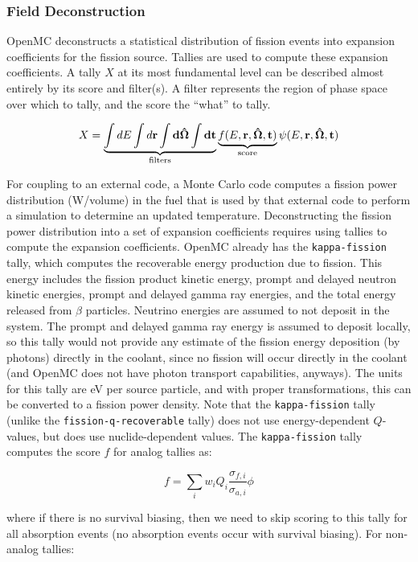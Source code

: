 \documentclass[10pt]{article}
\newcommand{\beq}{\begin{equation}}
\newcommand{\eeq}{\end{equation}}
\numberwithin{equation}{section} %
\begin{document}
\subsubsection{Field Deconstruction}
OpenMC deconstructs a statistical distribution of fission events into expansion coefficients for the fission source. Tallies are used to compute these expansion coefficients. A tally \(X\) at its most fundamental level can be described almost entirely by its score and filter(s). A filter represents the region of phase space over which to tally, and the score the ``what'' to tally. 

\beq
X=\underbrace{\int dE\int d\bf{r}\int d\hat{\Omega}\int dt}_{\textrm{filters}} \underbrace{f(E,\bf{r},\hat{\Omega},t)}_{\textrm{score}}\psi(E,\bf{r},\hat{\Omega},t)
\eeq

For coupling to an external code, a Monte Carlo code computes a fission power distribution (W/volume) in the fuel that is used by that external code to perform a simulation to determine an updated temperature. Deconstructing the fission power distribution into a set of expansion coefficients requires using tallies to compute the expansion coefficients. OpenMC already has the {\tt kappa-fission} tally, which computes the recoverable energy production due to fission. This energy includes the fission product kinetic energy, prompt and delayed neutron kinetic energies, prompt and delayed gamma ray energies, and the total energy released from \(\beta\) particles. Neutrino energies are assumed to not deposit in the system. The prompt and delayed gamma ray energy is assumed to deposit locally, so this tally would not provide any estimate of the fission energy deposition (by photons) directly in the coolant, since no fission will occur directly in the coolant (and OpenMC does not have photon transport capabilities, anyways). The units for this tally are eV per source particle, and with proper transformations, this can be converted to a fission power density. Note that the {\tt kappa-fission} tally (unlike the {\tt fission-q-recoverable} tally) does not use energy-dependent \(Q\)-values, but does use nuclide-dependent values. The {\tt kappa-fission} tally computes the score \(f\) for analog tallies as:

\beq
f=\sum_{i}w_iQ_i\frac{\sigma_{f,i}}{\sigma_{a,i}}\phi
\eeq

where if there is no survival biasing, then we need to skip scoring to this tally for all absorption events (no absorption events occur with survival biasing). For non-analog tallies:
\end{document}
